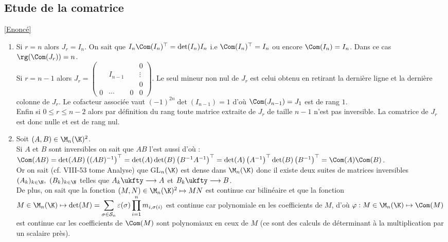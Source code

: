 \documentclass[8pt]{book}
\begin{document}
	\subsection{Etude de la comatrice }
	\label{Etude de la comatrice corrigé}
	\textcolor{blue}{\hyperref[Etude de la comatrice]{[Enoncé]}}\\
	\begin{enumerate}[leftmargin=*]
		\item Si $r=n$ alors $J_r=I_n$. On sait que $I_n\Com(I_n)^\top=\det(I_n)I_n$ i.e $\Com(I_n)^\top=I_n$ ou encore $\Com(I_n)=I_n$. Dans ce cas $\rg(\Com(J_r))=n$.\\
		Si $r=n-1$ alors $J_r=\left(\begin{array}{ccc|c}
			& & &0\\
			& I_{n-1}& &\vdots\\
			& & &0\\
			\hline
			0&\cdots&0&0
		\end{array}\right)$. Le seul mineur non nul de $J_r$ est celui obtenu en retirant la dernière ligne et la dernière colonne de $J_r$. Le cofacteur associée vaut $(-1)^{2n}\det(I_{n-1})=1$ d'où $\Com(J_{n-1})=J_1$ est de rang $1$.\\
		Enfin si $0\leq r\leq n-2$ alors par définition du rang toute matrice extraite de $J_r$ de taille $n-1$ n'est pas inversible. La comatrice de $J_r$ est donc nulle et est de rang nul.
		\item Soit $(A,B)\in \M_n(\K)^2$.\\
		Si $A$ et $B$ sont inversibles on sait que $AB$ l'est aussi d'où :\\
		$\Com(AB)=\det(AB)\left((AB)^{-1}\right)^\top=\det(A)\det(B)\left(B^{-1}A^{-1}\right)^\top=\det(A)\left(A^{-1}\right)^\top\det(B)\left(B^{-1}\right)^\top=\Com(A)\Com(B)$.\\
		Or on sait (cf. VIII-53 tome Analyse) que GL$_n(\K)$ est dense dans $\M_n(\K)$ donc il existe deux suites de matrices inversibles $(A_k)_{k\in \N},\ (B_k)_{k\in \N}$ telles que $A_k\ukfty\longrightarrow A$ et $B_k\ukfty\longrightarrow B$.\\
		De plus, on sait que la fonction $(M,N)\in \M_n(\K)^2\mapsto MN$ est continue car bilinéaire et que la fonction $M\in \M_n(\K) \mapsto\det(M)=\displaystyle\sum_{\sigma\in \mathcal S_n}\varepsilon(\sigma)\prod_{i=1}^nm_{i,\sigma(i)}$ est continue car polynomiale en les coefficients de $M$, d'où $\varphi:M\in \M_n(\K)\mapsto\Com(M)$ est continue car les coefficients de $\Com(M)$ sont polynomiaux en ceux de $M$ (ce sont des calculs de déterminant à la multiplication par un scalaire près).\\

\end{enumerate}
\end{document}
